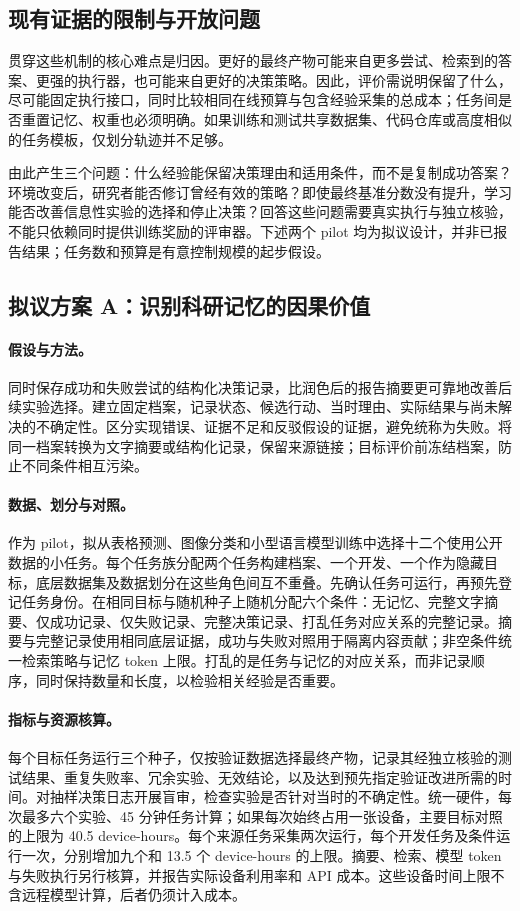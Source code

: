 \subsection{现有证据的限制与开放问题}

贯穿这些机制的核心难点是归因。更好的最终产物可能来自更多尝试、检索到的答案、更强的执行器，也可能来自更好的决策策略。因此，评价需说明保留了什么，尽可能固定执行接口，同时比较相同在线预算与包含经验采集的总成本；任务间是否重置记忆、权重也必须明确。如果训练和测试共享数据集、代码仓库或高度相似的任务模板，仅划分轨迹并不足够。

由此产生三个问题：什么经验能保留决策理由和适用条件，而不是复制成功答案？环境改变后，研究者能否修订曾经有效的策略？即使最终基准分数没有提升，学习能否改善信息性实验的选择和停止决策？回答这些问题需要真实执行与独立核验，不能只依赖同时提供训练奖励的评审器。下述两个 pilot 均为拟议设计，并非已报告结果；任务数和预算是有意控制规模的起步假设。

\subsection{拟议方案 A：识别科研记忆的因果价值}

\paragraph{假设与方法。}
同时保存成功和失败尝试的结构化决策记录，比润色后的报告摘要更可靠地改善后续实验选择。建立固定档案，记录状态、候选行动、当时理由、实际结果与尚未解决的不确定性。区分实现错误、证据不足和反驳假设的证据，避免统称为失败。将同一档案转换为文字摘要或结构化记录，保留来源链接；目标评价前冻结档案，防止不同条件相互污染。

\paragraph{数据、划分与对照。}
作为 pilot，拟从表格预测、图像分类和小型语言模型训练中选择十二个使用公开数据的小任务。每个任务族分配两个任务构建档案、一个开发、一个作为隐藏目标，底层数据集及数据划分在这些角色间互不重叠。先确认任务可运行，再预先登记任务身份。在相同目标与随机种子上随机分配六个条件：无记忆、完整文字摘要、仅成功记录、仅失败记录、完整决策记录、打乱任务对应关系的完整记录。摘要与完整记录使用相同底层证据，成功与失败对照用于隔离内容贡献；非空条件统一检索策略与记忆 token 上限。打乱的是任务与记忆的对应关系，而非记录顺序，同时保持数量和长度，以检验相关经验是否重要。

\paragraph{指标与资源核算。}
每个目标任务运行三个种子，仅按验证数据选择最终产物，记录其经独立核验的测试结果、重复失败率、冗余实验、无效结论，以及达到预先指定验证改进所需的时间。对抽样决策日志开展盲审，检查实验是否针对当时的不确定性。统一硬件，每次最多六个实验、45 分钟任务计算；如果每次始终占用一张设备，主要目标对照的上限为 40.5 device-hours。每个来源任务采集两次运行，每个开发任务及条件运行一次，分别增加九个和 13.5 个 device-hours 的上限。摘要、检索、模型 token 与失败执行另行核算，并报告实际设备利用率和 API 成本。这些设备时间上限不含远程模型计算，后者仍须计入成本。

